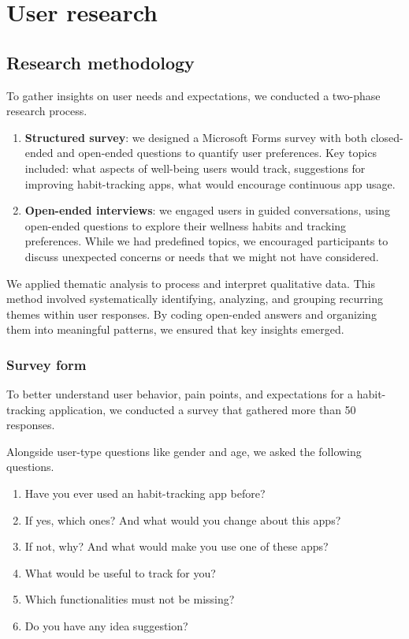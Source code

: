 \documentclass{article}
\begin{document}
\section{User research}

\subsection{Research methodology}

To gather insights on user needs and expectations, we conducted a two-phase research process.

\begin{enumerate}
    \item \textbf{Structured survey}: we designed a Microsoft Forms survey with both closed-ended and open-ended questions to quantify user preferences. Key topics included: what aspects of well-being users would track, suggestions for improving habit-tracking apps, what would encourage continuous app usage.
    \item \textbf{Open-ended interviews}: we engaged users in guided conversations, using open-ended questions to explore their wellness habits and tracking preferences. While we had predefined topics, we encouraged participants to discuss unexpected concerns or needs that we might not have considered.
\end{enumerate}

We applied thematic analysis to process and interpret qualitative data.
This method involved systematically identifying, analyzing, and grouping recurring themes within user responses.
By coding open-ended answers and organizing them into meaningful patterns, we ensured that key insights emerged.

\subsubsection{Survey form}

To better understand user behavior, pain points, and expectations for a habit-tracking application, we conducted a survey that gathered more than 50 responses.

Alongside user-type questions like gender and age, we asked the following questions.

\begin{enumerate}
    \item Have you ever used an habit-tracking app before?
    \item If yes, which ones? And what would you change about this apps?
    \item If not, why? And what would make you use one of these apps?
    \item What would be useful to track for you?
    \item Which functionalities must not be missing?
    \item Do you have any idea suggestion?
\end{enumerate}
\end{document}
